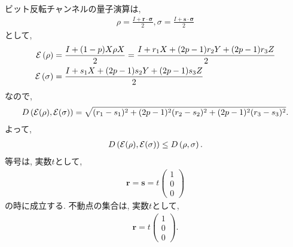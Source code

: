 \begin{ex}
    \label{ex9.13}
    ビット反転チャンネルの量子演算は,
    \begin{align*}
        \rho = \frac{I + \bm{r} \cdot \bm{\sigma}}{2},
        \sigma = \frac{I + \bm{s} \cdot \bm{\sigma}}{2}
    \end{align*}
    として,
    \begin{align*}
        \mathcal{E} \left( \rho\right)
         & =
        \frac{I + (1-p) X \rho X}{2}
        =
        \frac{I + r_1 X + (2p-1)r_2Y + (2p-1)r_3Z}{2} \\
        \mathcal{E} \left( \sigma\right)
         & =
        \frac{I + s_1 X + (2p-1)s_2Y + (2p-1)s_3Z}{2}
    \end{align*}
    なので,
    \begin{align*}
        D \left( \mathcal{E}(\rho), \mathcal{E}(\sigma)\right)=
        \sqrt{(r_1 - s_1)^2 + (2p-1)^2(r_2 - s_2)^2 + (2p-1)^2(r_3 - s_3)^2}.
    \end{align*}
    よって,
    \begin{align*}
        D \left( \mathcal{E}(\rho), \mathcal{E}(\sigma)\right)
        \leq
        D \left(\rho, \sigma\right).
    \end{align*}
    等号は, 実数$t$として,
    \begin{align*}
        \bm{r} = \bm{s} = t
        \begin{pmatrix}
            1 \\ 0\\ 0
        \end{pmatrix}
    \end{align*}
    の時に成立する. 不動点の集合は, 実数$t$として,
    \begin{align*}
        \bm{r} = t
        \begin{pmatrix}
            1 \\ 0\\ 0
        \end{pmatrix}.
    \end{align*}
\end{ex}

